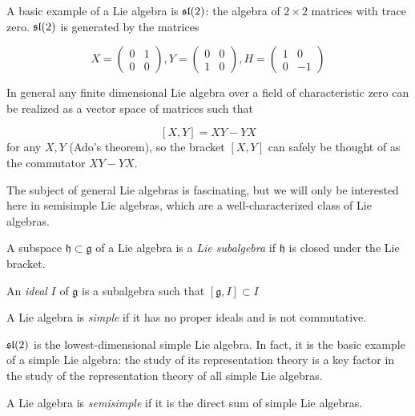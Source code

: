 A basic example of a Lie algebra is $\mathfrak{sl}(2)$: the algebra of $2 \times 2$
matrices with trace zero. $\mathfrak{sl}(2)$ is generated by the matrices 

\begin{equation}
    X = \begin{pmatrix} 0 & 1 \\ 0 & 0 \end{pmatrix},
    Y = \begin{pmatrix} 0 & 0 \\ 1 & 0 \end{pmatrix}, 
    H = \begin{pmatrix} 1 & 0 \\ 0 &-1 \end{pmatrix}
\end{equation}

In general any finite dimensional Lie algebra over a
field of characteristic zero can be realized as a vector space of matrices such
that 

\[ \left[ X,Y \right] = XY - YX\] 
for any $X,Y$ (Ado's theorem), so the bracket $[X,Y]$ can safely be thought of
as the commutator $XY - YX$. 


The subject of general Lie algebras is fascinating, but we will only be
interested here in semisimple Lie algebras, which are a well-characterized
class of Lie algebras. 

\begin{defn}
    A subspace $\mathfrak{h} \subset \mathfrak{g}$ of a Lie algebra is a
    \emph{Lie subalgebra} if $\mathfrak{h}$ is closed under the Lie bracket. 

    An \emph{ideal} $I$ of $\mathfrak{g}$ is a subalgebra such that $[\mathfrak{g}, I] \subset I$
\end{defn}

\begin{defn}
    A Lie algebra is \emph{simple} if it has no proper ideals and is not
    commutative. 
\end{defn}

$\mathfrak{sl}(2)$ is the lowest-dimensional simple Lie algebra. In fact, it is the
basic example of a simple Lie algebra: the study of its representation theory
is a key factor in the study of the representation theory of all simple Lie
algebras.


\begin{defn}
    A Lie algebra is \emph{semisimple} if it is the direct sum of simple Lie algebras.
\end{defn}

